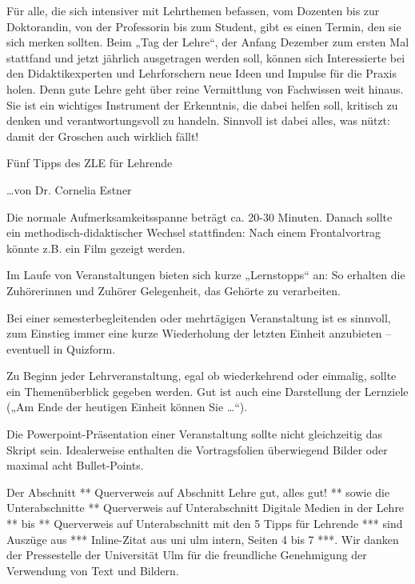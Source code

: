 
Für alle, die sich intensiver mit Lehrthemen befassen, vom Dozenten bis zur Doktorandin, von der Professorin bis zum Student, gibt es einen Termin, den sie sich merken sollten. Beim „Tag der Lehre“, der Anfang Dezember zum ersten Mal stattfand und jetzt jährlich ausgetragen werden soll, können sich Interessierte bei den Didaktikexperten und Lehrforschern neue Ideen und Impulse für die Praxis holen. Denn gute Lehre geht über reine Vermittlung von Fachwissen weit hinaus. Sie ist ein wichtiges Instrument der Erkenntnis, die dabei helfen soll, kritisch zu denken und verantwortungsvoll zu handeln. Sinnvoll ist dabei alles, was nützt: damit der Groschen auch wirklich fällt! 


Fünf Tipps des ZLE für Lehrende

\ldots von Dr. Cornelia Estner


\begin{???}
\item Die normale Aufmerksamkeitsspanne beträgt ca. 20-30 Minuten. Danach sollte
ein methodisch-didaktischer Wechsel stattfinden: Nach einem Frontalvortrag könnte z.B. ein 
Film gezeigt werden.
\item Im Laufe von Veranstaltungen bieten sich kurze „Lernstopps“ an: So erhalten die 
Zuhörerinnen und Zuhörer Gelegenheit, das Gehörte zu verarbeiten.
\item Bei einer semesterbegleitenden oder mehrtägigen Veranstaltung ist es sinnvoll, zum Einstieg immer eine kurze Wiederholung der letzten Einheit anzubieten – eventuell in Quizform. 
\item Zu Beginn jeder Lehrveranstaltung, egal ob wiederkehrend
oder einmalig, sollte ein Themenüberblick gegeben werden. Gut ist auch eine Darstellung der Lernziele („Am Ende der heutigen Einheit können Sie \ldots{}“).
\item Die Powerpoint-Präsentation einer Veranstaltung sollte nicht gleichzeitig das Skript
sein. Idealerweise enthalten die Vortragsfolien überwiegend Bilder oder maximal
acht Bullet-Points.
\end{???}

Der Abschnitt ** Querverweis auf Abschnitt Lehre gut, alles gut! ** sowie die Unterabschnitte ** Querverweis auf Unterabschnitt Digitale Medien in der Lehre ** bis ** Querverweis auf Unterabschnitt mit den 5 Tipps für Lehrende *** sind Auszüge aus *** Inline-Zitat aus uni ulm intern, Seiten 4 bis 7 ***. Wir danken der Pressestelle der Universität Ulm für die freundliche Genehmigung der Verwendung von Text und Bildern.

